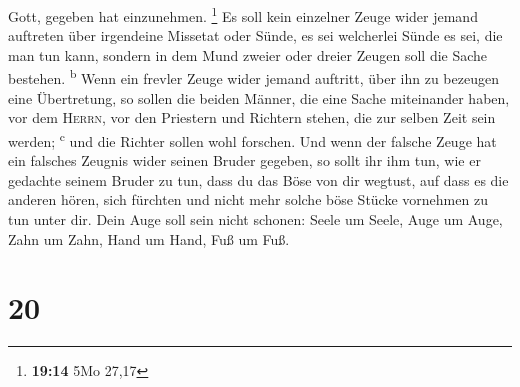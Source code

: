 Gott, gegeben hat einzunehmen. \footnote{\textbf{19:14} 5Mo 27,17}
 Es soll kein einzelner Zeuge wider jemand auftreten über
irgendeine Missetat oder Sünde, es sei welcherlei Sünde es sei, die man
tun kann, sondern in dem Mund zweier oder dreier Zeugen soll die Sache
bestehen. \textsuperscript{b}  Wenn ein frevler Zeuge
wider jemand auftritt, über ihn zu bezeugen eine Übertretung,
 so sollen die beiden Männer, die eine Sache miteinander
haben, vor dem \textsc{Herrn}, vor den Priestern und Richtern stehen,
die zur selben Zeit sein werden; \textsuperscript{c}  und
die Richter sollen wohl forschen. Und wenn der falsche Zeuge hat ein
falsches Zeugnis wider seinen Bruder gegeben,  so sollt
ihr ihm tun, wie er gedachte seinem Bruder zu tun, dass du das Böse von
dir wegtust,  auf dass es die anderen hören, sich
fürchten und nicht mehr solche böse Stücke vornehmen zu tun unter dir.
 Dein Auge soll sein nicht schonen: Seele um Seele, Auge
um Auge, Zahn um Zahn, Hand um Hand, Fuß um Fuß.

\hypertarget{section-19}{%
\section{20}\label{section-19}}

